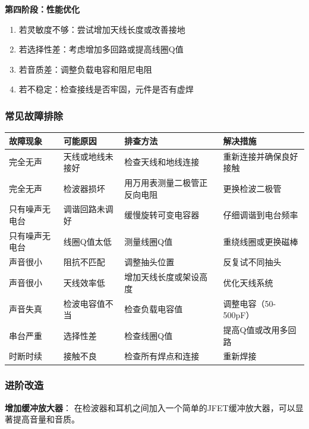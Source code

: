 \textbf{第四阶段：性能优化}
\begin{enumerate}
    \item 若灵敏度不够：尝试增加天线长度或改善接地
    \item 若选择性差：考虑增加多回路或提高线圈Q值
    \item 若音质差：调整负载电容和阻尼电阻
    \item 若不稳定：检查接线是否牢固，元件是否有虚焊
\end{enumerate}

\subsubsection{常见故障排除}
\label{sec:crystal_radio_troubleshoot}

\begin{center}
\begin{tabular}{|p{3cm}|p{4cm}|p{4cm}|p{3cm}|}
\hline
\textbf{故障现象} & \textbf{可能原因} & \textbf{排查方法} & \textbf{解决措施} \\
\hline
完全无声 & 天线或地线未接好 & 检查天线和地线连接 & 重新连接并确保良好接触 \\
完全无声 & 检波器损坏 & 用万用表测量二极管正反向电阻 & 更换检波二极管 \\
只有噪声无电台 & 调谐回路未调好 & 缓慢旋转可变电容器 & 仔细调谐到电台频率 \\
只有噪声无电台 & 线圈Q值太低 & 测量线圈Q值 & 重绕线圈或更换磁棒 \\
声音很小 & 阻抗不匹配 & 调整抽头位置 & 反复试不同抽头 \\
声音很小 & 天线效率低 & 增加天线长度或架设高度 & 优化天线系统 \\
声音失真 & 检波电容值不当 & 检查负载电容值 & 调整电容（50-500pF） \\
串台严重 & 选择性差 & 检查线圈Q值 & 提高Q值或改用多回路 \\
时断时续 & 接触不良 & 检查所有焊点和连接 & 重新焊接 \\
\hline
\end{tabular}
\end{center}

\subsubsection{进阶改造}
\label{sec:crystal_radio_upgrade}

\textbf{增加缓冲放大器}：
在检波器和耳机之间加入一个简单的JFET缓冲放大器，可以显著提高音量和音质。

